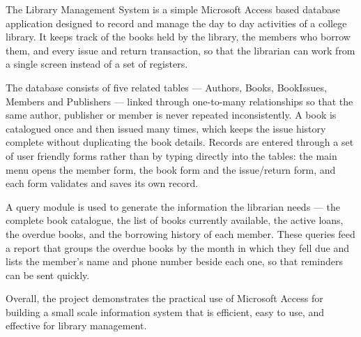 {\fontsize{12}{15.6}\selectfont
\setlength{\parskip}{8pt}

The Library Management System is a simple Microsoft Access based database
application designed to record and manage the day to day activities of a
college library. It keeps track of the books held by the library, the members
who borrow them, and every issue and return transaction, so that the librarian
can work from a single screen instead of a set of registers.

The database consists of five related tables --- Authors, Books, BookIssues,
Members and Publishers --- linked through one-to-many relationships so that the
same author, publisher or member is never repeated inconsistently. A book is
catalogued once and then issued many times, which keeps the issue history
complete without duplicating the book details. Records are entered through a
set of user friendly forms rather than by typing directly into the tables: the
main menu opens the member form, the book form and the issue/return form, and
each form validates and saves its own record.

A query module is used to generate the information the librarian needs --- the
complete book catalogue, the list of books currently available, the active
loans, the overdue books, and the borrowing history of each member. These
queries feed a report that groups the overdue books by the month in which they
fell due and lists the member's name and phone number beside each one, so that
reminders can be sent quickly.

Overall, the project demonstrates the practical use of Microsoft Access for
building a small scale information system that is efficient, easy to use, and
effective for library management.

\par}

\vspace{14pt}



\clearpage
{}



